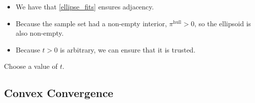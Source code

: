 \begin{itemize}
\item We have that \cref{ellipse_fits} ensures adjacency.
\item Because the sample set had a non-empty interior, $ \pi^{\textrm{hull}} > 0$, so the ellipsoid is also non-empty.
\item Because $t > 0$ is arbitrary, we can ensure that it is trusted.
\end{itemize}

\begin{boxedcomment}
Choose a value of $t$.
\end{boxedcomment}


% 
% 
% 

\subsection{Convex Convergence}
% 
% 




